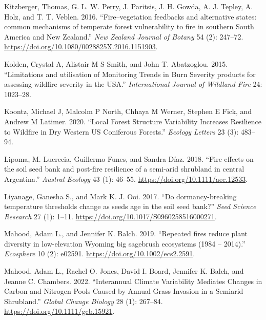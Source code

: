 \documentclass[
  12pt,
]{article}
\newlength{\cslhangindent}
\newlength{\cslentryspacingunit} %
\newenvironment{CSLReferences}[2] %
 {%
  \setlength{\parindent}{0pt}
  \ifodd #1
  \let\oldpar\par
  \def\par{\hangindent=\cslhangindent\oldpar}
  \fi
  \setlength{\parskip}{#2\cslentryspacingunit}
 }%
 {}
\begin{document}
\begin{CSLReferences}{1}{0}
\leavevmode{}%
Kitzberger, Thomas, G. L. W. Perry, J. Paritsis, J. H. Gowda, A. J.
Tepley, A. Holz, and T. T. Veblen. 2016. {``{Fire--vegetation feedbacks
and alternative states: common mechanisms of temperate forest
vulnerability to fire in southern South America and New Zealand}.''}
\emph{New Zealand Journal of Botany} 54 (2): 247--72.
\url{https://doi.org/10.1080/0028825X.2016.1151903}.

\leavevmode{}%
Kolden, Crystal A, Alistair M S Smith, and John T. Abatzoglou. 2015.
{``{Limitations and utilisation of Monitoring Trends in Burn Severity
products for assessing wildfire severity in the USA}.''}
\emph{International Journal of Wildland Fire} 24: 1023--28.

\leavevmode{}%
Koontz, Michael J, Malcolm P North, Chhaya M Werner, Stephen E Fick, and
Andrew M Latimer. 2020. {``Local Forest Structure Variability Increases
Resilience to Wildfire in Dry Western US Coniferous Forests.''}
\emph{Ecology Letters} 23 (3): 483--94.

\leavevmode{}%
Lipoma, M. Lucrecia, Guillermo Funes, and Sandra Díaz. 2018. {``{Fire
effects on the soil seed bank and post-fire resilience of a semi-arid
shrubland in central Argentina}.''} \emph{Austral Ecology} 43 (1):
46--55. \url{https://doi.org/10.1111/aec.12533}.

\leavevmode{}%
Liyanage, Ganesha S., and Mark K. J. Ooi. 2017. {``{Do dormancy-breaking
temperature thresholds change as seeds age in the soil seed bank?}''}
\emph{Seed Science Research} 27 (1): 1--11.
\url{https://doi.org/10.1017/S0960258516000271}.

\leavevmode{}%
Mahood, Adam L., and Jennifer K. Balch. 2019. {``{Repeated fires reduce
plant diversity in low-elevation Wyoming big sagebrush ecosystems (1984
-- 2014)}.''} \emph{Ecosphere} 10 (2): e02591.
\url{https://doi.org/10.1002/ecs2.2591}.

\leavevmode{}%
Mahood, Adam L., Rachel O. Jones, David I. Board, Jennifer K. Balch, and
Jeanne C. Chambers. 2022. {``Interannual Climate Variability Mediates
Changes in Carbon and Nitrogen Pools Caused by Annual Grass Invasion in
a Semiarid Shrubland.''} \emph{Global Change Biology} 28 (1): 267--84.
\url{https://doi.org/10.1111/gcb.15921}.


\end{CSLReferences}
\end{document}
